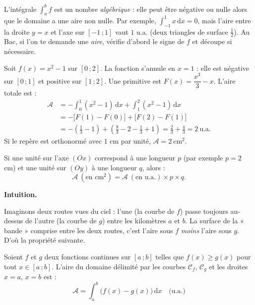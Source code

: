 \documentclass[11pt]{article}
\newcommand{\cle}[1]{{\popxbold\color{popdark}#1}}
\newcounter{popsec}
\newcounter{popsub}
\newcommand{\courssub}[1]{%
  \stepcounter{popsub}%
  \par\vspace{9pt}\noindent{\popxbold\fontsize{11.5}{13}\selectfont\color{popink}{\color{poporange}\thepopsec.\thepopsub}\hspace{6pt}#1}\par\nopagebreak\vspace{4pt}
}
\begin{document}
\begin{attention}
L'intégrale $\int_a^b f$ est un nombre \emph{algébrique} : elle peut être négative ou nulle alors que le domaine a une aire non nulle. Par exemple, $\int_{-1}^{1} x\,\mathrm{d}x = 0$, mais l'aire entre la droite $y=x$ et l'axe sur $[-1\,;1]$ vaut $1$ u.a. (deux triangles de surface $\tfrac12$). Au Bac, si l'on te demande une \emph{aire}, vérifie d'abord le \cle{signe} de $f$ et découpe si nécessaire.
\end{attention}

\begin{exemplebox}
Soit $f(x) = x^2 - 1$ sur $[0\,;2]$. La fonction s'annule en $x=1$ : elle est négative sur $[0\,;1]$ et positive sur $[1\,;2]$. Une primitive est $F(x) = \dfrac{x^3}{3} - x$. L'aire totale est :
\begin{align*}
\mathcal{A} &= -\int_0^1 (x^2-1)\,\mathrm{d}x + \int_1^2 (x^2-1)\,\mathrm{d}x \\
&= -\bigl[F(1)-F(0)\bigr] + \bigl[F(2)-F(1)\bigr] \\
&= -\left(\tfrac{1}{3}-1\right) + \left(\tfrac{8}{3}-2-\tfrac{1}{3}+1\right) = \tfrac{2}{3} + \tfrac{4}{3} = 2\ \text{u.a.}
\end{align*}
Si le repère est orthonormé avec $1$ cm par unité, $\mathcal{A} = 2\ \text{cm}^2$.
\end{exemplebox}

\begin{propriete}
Si une unité sur l'axe $(Ox)$ correspond à une longueur $p$ (par exemple $p = 2$ cm) et une unité sur $(Oy)$ à une longueur $q$, alors :
\[ \mathcal{A}\ (\text{en cm}^2) = \mathcal{A}\ (\text{en u.a.}) \times p \times q. \]
\end{propriete}

\courssub{Aire entre deux courbes}

\textbf{Intuition.}\par
Imaginons deux routes vues du ciel : l'une (la courbe de $f$) passe toujours au-dessus de l'autre (la courbe de $g$) entre les kilomètres $a$ et $b$. La surface de la « bande » comprise entre les deux routes, c'est l'aire sous $f$ \emph{moins} l'aire sous $g$. D'où la propriété suivante.

\begin{propriete}
Soient $f$ et $g$ deux fonctions continues sur $[a\,;b]$ telles que $f(x) \geq g(x)$ pour tout $x \in [a\,;b]$. L'aire du domaine délimité par les courbes $\mathcal{C}_f$, $\mathcal{C}_g$ et les droites $x=a$, $x=b$ est :
\[ \mathcal{A} = \int_a^b \bigl(f(x)-g(x)\bigr)\,\mathrm{d}x \quad \text{(u.a.)} \]
\end{propriete}
\end{document}
